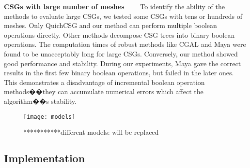 \vspace{0.5em}
\noindent\textbf{CSGs with large number of meshes}~~~~
To identify the ability of the methods to evaluate large CSGs, we tested some CSGs with tens or hundreds of meshes. Only QuichCSG and our method can perform multiple boolean operations directly. Other methods decompose CSG trees into binary boolean operations. The computation times of robust methods like CGAL and Maya were found to be unacceptably long for large CSGs. Conversely,  our method showed good performance and stability. During our experiments, Maya gave the correct results in the first few binary boolean operations, but failed in the later ones. This demonstrates a disadvantage of incremental boolean operation methods��they can accumulate numerical errors which affect the algorithm��s stability.


\begin{figure*}[!t]
\centering
\texttt{[image: models]}
\caption{***********different models: will be replaced}
\label{fig:models}
\end{figure*}

\subsection{Implementation}
\label{sec:esubroutine}


